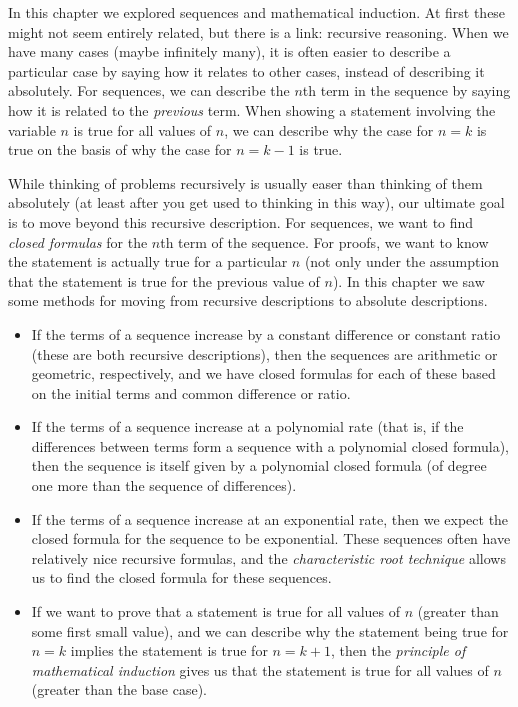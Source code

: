 \documentclass[10pt,]{book}
\theoremstyle{plain}
\theoremstyle{definition}
\theoremstyle{definition}
\theoremstyle{definition}
\numberwithin{equation}{chapter}
\begin{document}
      In this chapter we explored sequences and mathematical induction. At first these might not seem entirely related, but there is a link: recursive reasoning. When we have many cases (maybe infinitely many), it is often easier to describe a particular case by saying how it relates to other cases, instead of describing it absolutely. For sequences, we can describe the \(n\)th term in the sequence by saying how it is related to the \emph{previous} term. When showing a statement involving the variable \(n\) is true for all values of \(n\), we can describe why the case for \(n = k\) is true on the basis of why the case for \(n = k-1\) is true.
\par

      While thinking of problems recursively is usually easer than thinking of them absolutely (at least after you get used to thinking in this way), our ultimate goal is to move beyond this recursive description. For sequences, we want to find \emph{closed formulas} for the \(n\)th term of the sequence. For proofs, we want to know the statement is actually true for a particular \(n\) (not only under the assumption that the statement is true for the previous value of \(n\)). In this chapter we saw some methods for moving from recursive descriptions to absolute descriptions.
\par

      \leavevmode%
\begin{itemize}[label=\textbullet]
\item{}
            If the terms of a sequence increase by a constant difference or constant ratio (these are both recursive descriptions), then the sequences are arithmetic or geometric, respectively, and we have closed formulas for each of these based on the initial terms and common difference or ratio.
\item{}
            If the terms of a sequence increase at a polynomial rate (that is, if the differences between terms form a sequence with a polynomial closed formula), then the sequence is itself given by a polynomial closed formula (of degree one more than the sequence of differences).
\item{}
            If the terms of a sequence increase at an exponential rate, then we expect the closed formula for the sequence to be exponential. These sequences often have relatively nice recursive formulas, and the \emph{characteristic root technique} allows us to find the closed formula for these sequences.
\item{}
            If we want to prove that a statement is true for all values of \(n\) (greater than some first small value), and we can describe why the statement being true for \(n = k\) implies the statement is true for \(n = k+1\), then the \emph{principle of mathematical induction} gives us that the statement is true for all values of \(n\) (greater than the base case).
\end{itemize}
\end{document}

